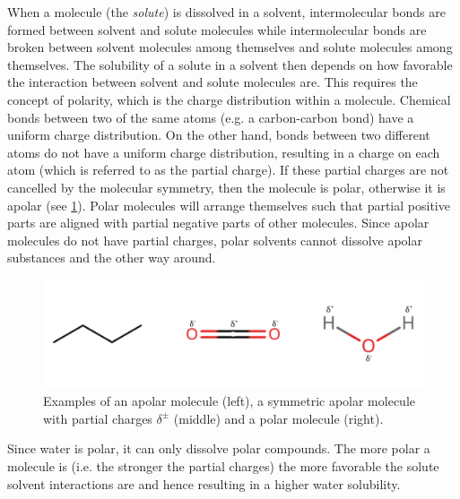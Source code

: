 When a molecule (the \textit{solute}) is dissolved in a solvent, intermolecular bonds 
are formed between solvent and solute molecules while intermolecular bonds are broken 
between solvent molecules among themselves and solute molecules among themselves. The 
solubility of a solute in a solvent then depends on how favorable the interaction between 
solvent and solute molecules are. This requires the concept of polarity, which is the charge 
distribution within a molecule. Chemical bonds between two of the same atoms (e.g.
a carbon-carbon bond) have a uniform charge distribution. On the other hand, bonds between 
two different atoms do not have a uniform charge distribution, resulting in a charge on 
each atom (which is referred to as the partial charge).  If these partial charges are 
not cancelled by the molecular symmetry, then the molecule is polar, otherwise it is apolar
(see \cref{fig:polar_apolar molecules}). Polar molecules will arrange themselves such 
that partial positive parts are aligned with partial negative parts of other molecules. 
Since apolar molecules do not have partial charges, polar solvents cannot dissolve apolar 
substances and the other way around.\cite{atkins2023atkins}

\begin{figure}[h]
    \centering
    \includegraphics[scale=0.7]{Fig/polar_apolar_molecules.png}
    \caption{Examples of an apolar molecule (left), a symmetric apolar molecule 
    with partial charges $\delta^{\pm}$ (middle) and a polar molecule (right).}
    \label{fig:polar_apolar molecules}
\end{figure}

Since water is polar, it can only dissolve polar compounds. The more polar a molecule is 
(i.e. the stronger the partial charges) the more favorable the solute solvent interactions 
are and hence resulting in a higher water solubility. 


